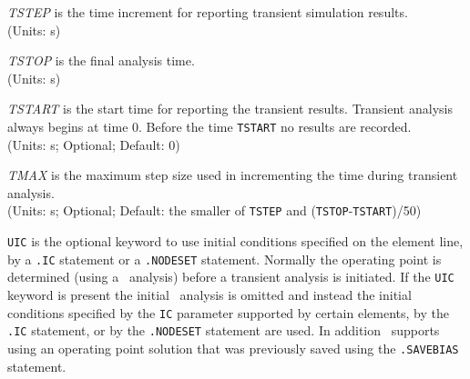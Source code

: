 \begin{widelist}
\item[{\it TSTEP}] is the time increment for reporting transient
simulation results.
\\(Units: s)

\item[{\it TSTOP}] is the final analysis time.
\\(Units: s)

\item[{\it TSTART}] is the start time for reporting the
        transient results. Transient analysis always begins at time 0.
        Before the time {\tt TSTART} no results are recorded.
        \\(Units: s; Optional; Default: 0)

\item[{\it TMAX}]
is the maximum  step size used in incrementing the time during transient
analysis.
        \\(Units: s; Optional; Default: the smaller of {\tt TSTEP}
    and ({\tt TSTOP}-{\tt TSTART})/50)

\item[{\tt UIC}] is the optional keyword to use initial conditions specified
on the element line, by a {\tt .IC} statement or a {\tt .NODESET} statement.
Normally the operating point is determined (using a \dc\ analysis) before a
transient analysis is initiated. If the {\tt UIC} keyword is present
the initial \dc\ analysis is omitted and instead the initial conditions
specified by the {\tt IC} parameter supported by certain elements,
by the {\tt .IC} statement,
or by the
{\tt .NODESET} statement are used.
{
In addition \pspice\ supports using an operating point solution
that was previously saved using the {\tt .SAVEBIAS} statement.}
\end{widelist}



